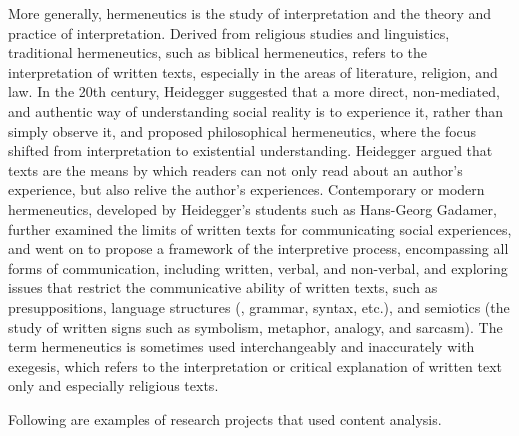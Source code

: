 More generally, hermeneutics is the study of interpretation and the theory and practice of interpretation. Derived from religious studies and linguistics, traditional hermeneutics, such as biblical hermeneutics, refers to the interpretation of written texts, especially in the areas of literature, religion, and law. In the 20th century, Heidegger suggested that a more direct, non-mediated, and authentic way of understanding social reality is to experience it, rather than simply observe it, and proposed philosophical hermeneutics, where the focus shifted from interpretation to existential understanding. Heidegger argued that texts are the means by which readers can not only read about an author's experience, but also relive the author's experiences. Contemporary or modern hermeneutics, developed by Heidegger's students such as Hans-Georg Gadamer, further examined the limits of written texts for communicating social experiences, and went on to propose a framework of the interpretive process, encompassing all forms of communication, including written, verbal, and non-verbal, and exploring issues that restrict the communicative ability of written texts, such as presuppositions, language structures (\eg, grammar, syntax, etc.), and semiotics (the study of written signs such as symbolism, metaphor, analogy, and sarcasm). The term hermeneutics is sometimes used interchangeably and inaccurately with exegesis, which refers to the interpretation or critical explanation of written text only and especially religious texts.

Following are examples of research projects that used content analysis.

